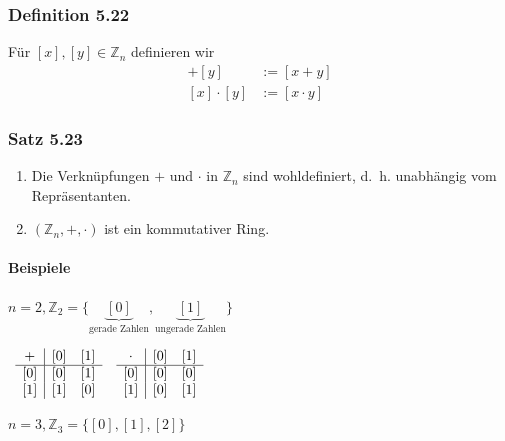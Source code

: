 \documentclass[a5paper, 10pt]{book}
\newcommand{\inZ}{\in\mathbb{Z}}
\begin{document}
				\subsubsection{Definition 5.22}
					Für $[x],[y] \inZ_n$ definieren wir
					\begin{align}
						[x] + [y] &:= [x+y]\\
						[x]\cdot[y]&:=[x\cdot y]
					\end{align}
					
				\subsubsection{Satz 5.23}
				\begin{enumerate}
					\item Die Verknüpfungen $+$ und $\cdot$ in $\mathbb{Z}_n$ sind wohldefiniert, d.~h. unabhängig vom Repräsentanten.
					\item $(\mathbb{Z}_n, +, \cdot)$ ist ein kommutativer Ring.
				\end{enumerate}
				\paragraph{Beispiele} $n=2, \mathbb{Z}_2 = \{ \underbrace{[0]}_{\text{gerade Zahlen}}, \underbrace{[1]}_\text{ungerade Zahlen}\} $
					\begin{center}
						$
						\begin{array}{cc}
							\begin{array}{c|cc}
								+ & [0] & [1] \\ 
								\hline 
								[0] & [0] & [1] \\\relax
								[1] & [1] & [0]
							\end{array}
							&
							\begin{array}{c|cc}
							\cdot & [0] & [1] \\ 
							\hline 
							[0] & [0] & [0] \\\relax
							[1] & [0] & [1]
							\end{array}
						\end{array}
						$
					\end{center}
				
				$n=3, \mathbb{Z}_3 = \{[0], [1], [2] \}$
				
\end{document}
